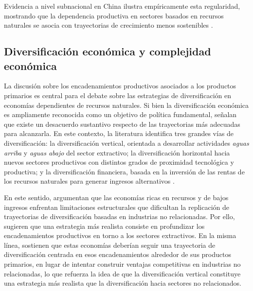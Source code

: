 \documentclass[../../PTFM.tex]{subfiles}
\begin{document}
	Evidencia a nivel subnacional en China ilustra empíricamente esta regularidad, mostrando que la dependencia productiva en sectores basados en recursos naturales se asocia con trayectorias de crecimiento menos sostenibles \parencite{Wu2018}.
	
	\subsection{Diversificación económica y complejidad económica}
	\label{subsec:diversificacion-economica}
	
	La discusión sobre los encadenamientos productivos asociados a los productos primarios es central para el debate sobre las estrategias de diversificación en economías dependientes de recursos naturales. Si bien la diversificación económica es ampliamente reconocida como un objetivo de política fundamental, \textcite{Coniglio2018} señalan que existe un desacuerdo sustantivo respecto de las trayectorias más adecuadas para alcanzarla. En este contexto, la literatura identifica tres grandes vías de diversificación: la diversificación vertical, orientada a desarrollar actividades \textit{aguas arriba} y \textit{aguas abajo} del sector extractivo; la diversificación horizontal hacia nuevos sectores productivos con distintos grados de proximidad tecnológica y productiva; y la diversificación financiera, basada en la inversión de las rentas de los recursos naturales para generar ingresos alternativos \parencite{Lebdioui2019}.
	
	En este sentido, \textcite{Morris2013} argumentan que las economías ricas en recursos y de bajos ingresos enfrentan limitaciones estructurales que dificultan la replicación de trayectorias de diversificación basadas en industrias no relacionadas. Por ello, sugieren que una estrategia más realista consiste en profundizar los encadenamientos productivos en torno a los sectores extractivos. En la misma línea, \textcite{Lebdioui2019} sostienen que estas economías deberían seguir una trayectoria de diversificación centrada en esos encadenamientos alrededor de sus productos primarios, en lugar de intentar construir ventajas competitivas en industrias no relacionadas, lo que refuerza la idea de que la diversificación vertical constituye una estrategia más realista que la diversificación hacia sectores no relacionados.
	
\end{document}
